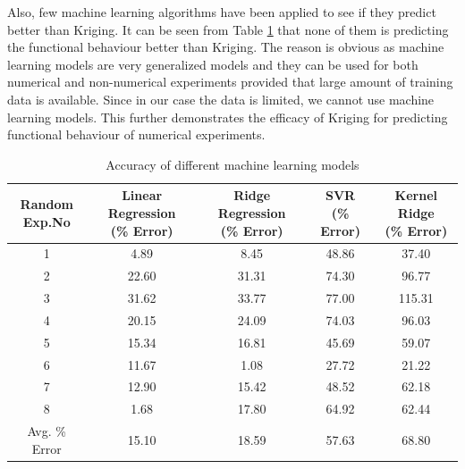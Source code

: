 Also, few machine learning algorithms have been applied to see if they predict better than Kriging. It can be seen from Table \ref{Accuracy of different machine learning models} that none of them is predicting the functional behaviour better than Kriging. The reason is obvious as machine learning models are very generalized models and they can be used for both numerical and non-numerical experiments provided that large amount of training data is available. Since in our case the data is limited, we cannot use machine learning models. This further demonstrates the efficacy of Kriging for predicting functional behaviour of numerical experiments.
\begin{table}[H]
	\caption{Accuracy of different machine learning models}
	\label{Accuracy of different machine learning models}
	\centering
	\begin{tabular}{ccccc}
		\hline \hline
		\specialcell{ Random \\ Exp.No}	& \specialcell{Linear Regression \\ (\% Error)}	&\specialcell{Ridge Regression \\ (\% Error)}	& \specialcell{SVR \\ (\% Error)} & \specialcell{Kernel Ridge \\ (\% Error)} \\
		\hline \hline
		1 &4.89	&8.45	&48.86	&37.40 \\
		2 &22.60	&31.31	&74.30	&96.77 \\
		3 &31.62	&33.77	&77.00	&115.31 \\
		4 &20.15	&24.09	&74.03	&96.03 \\
		5 &15.34	&16.81	&45.69	&59.07 \\
		6 &11.67	&1.08	&27.72	&21.22 \\
		7 &12.90	&15.42	&48.52	&62.18 \\
		8 &1.68	&17.80	&64.92	&62.44  \\ 
		\hline \hline
		Avg. \% Error  &15.10	&18.59	&57.63	&68.80		 \\
		\hline \hline
	\end{tabular}
\end{table}








